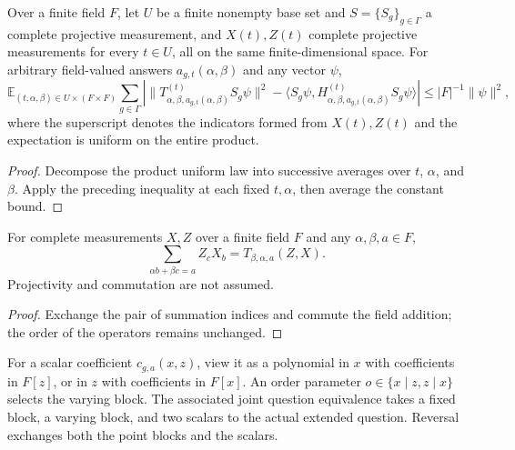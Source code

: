 \begin{theorem}
\label{thm:aux-projective-exceptional-uniform}
\leanok
{}
Over a finite field $F$, let $U$ be a finite nonempty base set and
$S=\{S_g\}_{g\in\Gamma}$ a
complete projective measurement, and $X(t),Z(t)$ complete projective
measurements for every $t\in U$, all on the same finite-dimensional
space. For arbitrary field-valued answers $a_{g,t}(\alpha,\beta)$ and
any vector $\psi$,
\[
 \mathbb E_{(t,\alpha,\beta)\in U\times(F\times F)}\sum_{g\in\Gamma}
 \left|\|T^{(t)}_{\alpha,\beta,a_{g,t}(\alpha,\beta)}S_g\psi\|^2
 -\langle S_g\psi,
 H^{(t)}_{\alpha,\beta,a_{g,t}(\alpha,\beta)}S_g\psi\rangle\right|
 \leq |F|^{-1}\|\psi\|^2,
\]
where the superscript denotes the indicators formed from $X(t),Z(t)$
and the expectation is uniform on the entire product.
\end{theorem}
\begin{proof}
\leanok
{}
Decompose the product uniform law into successive averages over $t$,
$\alpha$, and $\beta$. Apply the preceding inequality at each fixed
$t,\alpha$, then average the constant bound.
\end{proof}

\begin{theorem}
\label{thm:aux-ordered-indicator-reverse}
\leanok
{}
For complete measurements $X,Z$ over a finite field $F$ and any
$\alpha,\beta,a\in F$,
\[
 \sum_{\alpha b+\beta c=a}Z_cX_b
 =T_{\beta,\alpha,a}(Z,X).
\]
Projectivity and commutation are not assumed.
\end{theorem}
\begin{proof}
\leanok
{}
Exchange the pair of summation indices and commute the field addition;
the order of the operators remains unchanged.
\end{proof}

\begin{definition}
\label{def:qld-block-coefficient-polynomial}
\leanok
For a scalar coefficient $c_{g,a}(x,z)$, view it as a polynomial in $x$
with coefficients in $F[z]$, or in $z$ with coefficients in $F[x]$.
An order parameter $o\in\{x\mid z,z\mid x\}$ selects the varying block.
The associated joint question equivalence takes a fixed block, a varying
block, and two scalars to the actual extended question. Reversal exchanges
both the point blocks and the scalars.
\end{definition}

